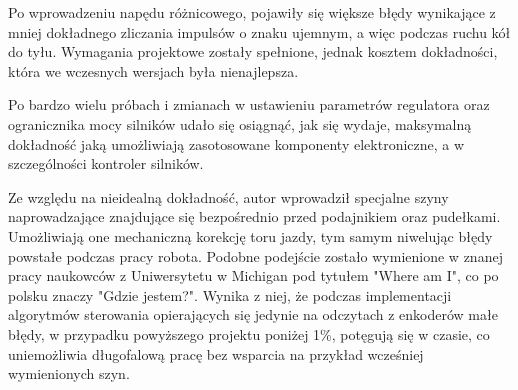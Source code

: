 Po wprowadzeniu napędu różnicowego, pojawiły się większe błędy wynikające z mniej dokładnego zliczania impulsów o znaku ujemnym, a więc podczas ruchu kół do tyłu. Wymagania projektowe zostały spełnione, jednak kosztem dokładności, która we wczesnych wersjach była nienajlepsza. 

Po bardzo wielu próbach i zmianach w ustawieniu parametrów regulatora oraz ogranicznika mocy silników udało się osiągnąć, jak się wydaje, maksymalną dokładność jaką umożliwiają zasotosowane komponenty elektroniczne, a w szczególności kontroler silników. 

Ze względu na nieidealną dokładność, autor wprowadził specjalne szyny naprowadzające znajdujące się bezpośrednio przed podajnikiem oraz pudełkami. Umożliwiają one mechaniczną korekcję toru jazdy, tym samym niwelując błędy powstałe podczas pracy robota. Podobne podejście zostało wymienione w znanej pracy naukowców z Uniwersytetu w Michigan pod tytułem "Where am I", co po polsku znaczy "Gdzie jestem?"\cite{bib:where-am-i}. Wynika z niej, że podczas implementacji algorytmów sterowania opierających się jedynie na odczytach z enkoderów małe błędy, w przypadku powyższego projektu poniżej 1\%, potęgują się w czasie, co uniemożliwia długofalową pracę bez wsparcia na przykład wcześniej wymienionych szyn.  
